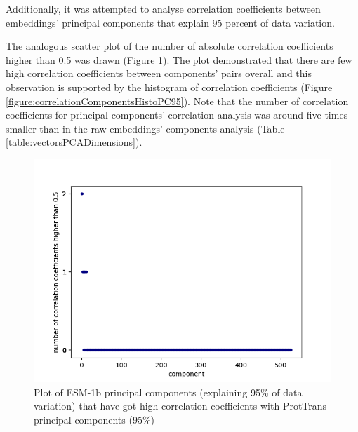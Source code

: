 \documentclass[12pt]{article}
\begin{document}
	\newpage

	Additionally, it was attempted to analyse correlation coefficients between 
	embeddings' principal components that explain 95 percent of data variation.

	The analogous scatter plot of the number of absolute correlation 
	coefficients higher than 0.5 was drawn
	(Figure \ref{figure:highCorrelationComponentsPC95}). The plot 
	demonstrated that there are few high correlation coefficients 
	between components' pairs overall and this observation is supported 
	by the histogram of correlation coefficients 
	(Figure \ref{figure:correlationComponentsHistoPC95}). Note that the 
	number of correlation coefficients for principal components' correlation 
	analysis was around five times smaller than in the raw embeddings' components
	analysis (Table \ref{table:vectorsPCADimensions}).

	\begin{figure}[h!]
		\centering
		\includegraphics[scale=0.85]{validation_small_set_2_joined_PC_95_correlation_high_corr.png}

		\caption{Plot of ESM-1b principal components (explaining 
		95\% of data variation) that have got high correlation coefficients 
		with ProtTrans principal components (95\%)}
		\label{figure:highCorrelationComponentsPC95}
	\end{figure}

	\newpage
\end{document}
